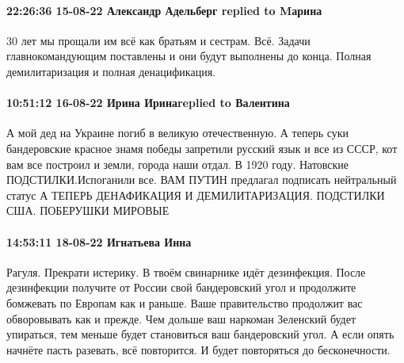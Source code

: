  
 
 
 
 

\paragraph{22:26:36 15-08-22 Александр Адельберг replied to Mарина}

30 лет мы прощали им всё как братьям и сестрам. Всё. Задачи главнокомандующим
поставлены и они будут выполнены до конца.
Полная демилитаризация и полная денацификация.

\paragraph{10:51:12 16-08-22 Ирина Иринаreplied to Валентина}

\obeycr
А мой дед на Украине погиб в великую отечественную.
А теперь суки бандеровские красное знамя победы запретили русский язык и все из СССР, кот вам все построил и земли, города наши отдал. В 1920 году.
Натовские ПОДСТИЛКИ.Испоганили все.
ВАМ ПУТИН предлагал подписать нейтральный статус
А ТЕПЕРЬ ДЕНАФИКАЦИЯ И ДЕМИЛИТАРИЗАЦИЯ.
ПОДСТИЛКИ США.
ПОБЕРУШКИ МИРОВЫЕ
\restorecr

\paragraph{14:53:11 18-08-22 Игнатьева Инна}

Рагуля. Прекрати истерику. В твоём свинарнике идёт дезинфекция.  После
дезинфекции получите от России свой бандеровский угол и продолжите бомжевать по
Европам как и раньше.  Ваше правительство продолжит вас обворовывать как и
прежде.  Чем дольше ваш наркоман Зеленский будет упираться, тем меньше будет
становиться ваш бандеровский угол.  А если опять начнёте пасть разевать, всё
повторится. И будет повторяться до бесконечности. 
